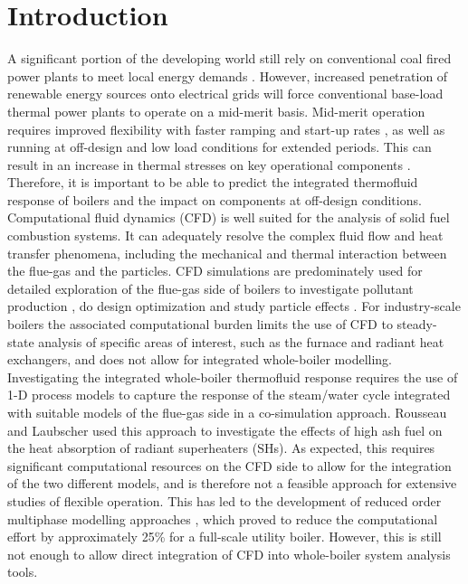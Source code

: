 \documentclass[a4paper,fleqn]{cas-dc}
\begin{document}
\maketitle

\section{Introduction}\label{intro}
A significant portion of the developing world still rely on conventional coal fired power plants to meet local energy demands \cite{Rousseau2020}. However, increased penetration of renewable energy sources onto electrical grids will force conventional base-load thermal power plants to operate on a mid-merit basis. Mid-merit operation requires improved flexibility with faster ramping and start-up rates \cite{Safdarnejad2019}, as well as running at off-design and low load conditions for extended periods. This can result in an increase in thermal stresses on key operational components \cite{Modlinski2019}. Therefore, it is important to be able to predict the integrated thermofluid response of boilers and the impact on components at off-design conditions.\\

Computational fluid dynamics (CFD) is well suited for the analysis of solid fuel combustion systems. It can adequately resolve the complex fluid flow and heat transfer phenomena, including the mechanical and thermal interaction between the flue-gas and the particles. CFD simulations are predominately used for detailed exploration of the flue-gas side of boilers to investigate pollutant production \cite{Liu2021}, do design optimization \cite{dugum2019, Gu2020} and study particle effects \cite{Laubscher2020}. For industry-scale boilers the associated computational burden limits the use of CFD to steady-state analysis of specific areas of interest, such as the furnace and radiant heat exchangers, and does not allow for integrated whole-boiler modelling.\\

Investigating the integrated whole-boiler thermofluid response requires the use of 1-D process models to capture the response of the steam/water cycle integrated with suitable models of the flue-gas side in a co-simulation approach. Rousseau and Laubscher \cite{Rousseau2020} used this approach to investigate the effects of high ash fuel on the heat absorption of radiant superheaters (SHs). As expected, this requires significant computational resources on the CFD side to allow for the integration of the two different models, and is therefore not a feasible approach for extensive studies of flexible operation. This has led to the development of reduced order multiphase modelling approaches \cite{Rawlins2021, INFUB2022}, which proved to reduce the computational effort by approximately 25\% for a full-scale utility boiler.  However, this is still not enough to allow direct integration of CFD into whole-boiler system analysis tools. \\
\end{document}
